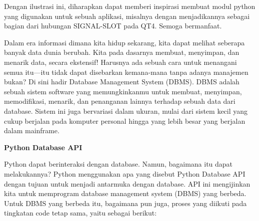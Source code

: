 \documentclass{wileySix}
\begin{document}
\vspace{12pt}
Dengan ilustrasi ini, diharapkan dapat memberi inspirasi membuat modul python yang digunakan untuk sebuah aplikasi, misalnya dengan menjadikannya sebagai bagian dari hubungan SIGNAL-SLOT pada QT4. Semoga bermanfaat. \par
\vspace{12pt}
Dalam era informasi dimana kita hidup sekarang, kita dapat melihat seberapa banyak data dunia berubah. Kita pada dasarnya membuat, menyimpan, dan menarik data, secara ekstensif! Harusnya ada sebuah cara untuk menangani semua itu—itu tidak dapat disebarkan kemana-mana tanpa adanya manajemen bukan? Di sini hadir Database Management System (DBMS). DBMS adalah sebuah sistem software yang memungkinkanmu untuk membuat, menyimpan, memodifikasi, menarik, dan penanganan lainnya terhadap sebuah data dari database. Sistem ini juga bervariasi dalam ukuran, mulai dari sistem kecil yang cukup berjalan pada komputer personal hingga yang lebih besar yang berjalan dalam mainframe. \par
\vspace{12pt}
\noindent 
\textbf{Python Database API} \par
Python dapat berinteraksi dengan database. Namun, bagaimana itu dapat melakukannya? Python menggunakan apa yang disebut Python Database API dengan tujuan untuk menjadi antarmuka dengan database. API ini mengijinkan kita untuk memprogram database management system (DBMS) yang berbeda. Untuk DBMS yang berbeda itu, bagaimana pun juga, proses yang diikuti pada tingkatan code tetap sama, yaitu sebagai berikut: \par
\vspace{12pt}
\end{document}

